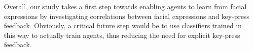 \documentclass[10pt,journal,compsoc]{IEEEtran}
\begin{document}
Overall, our study takes a first step towards enabling agents to learn from facial expressions by investigating correlations between facial expressions and key-press feedback.  Obviously, a critical future step would be to use classifiers trained in this way to actually train agents, thus reducing the need for explicit key-press feedback.  

%
\end{document}
